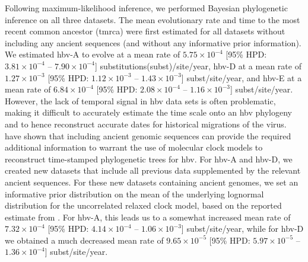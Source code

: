 Following maximum-likelihood inference, we performed Bayesian phylogenetic inference on all three datasets.
The mean evolutionary rate and time to the most recent common ancestor (\gls{tmrca}) were first estimated for all datasets without including any ancient sequences (and without any informative prior information).
We estimated \gls{hbv}-A to evolve at a mean rate of $5.75 \times 10^{-4}$ [95\% HPD: $3.81 \times 10^{-4}$ -- $7.90 \times 10^{-4}$] substitutions(subst)/site/year, \gls{hbv}-D at a mean rate of $1.27 \times 10^{-3}$ [95\% HPD: $1.12 \times 10^{-3}$ -- $1.43 \times 10^{-3}$] subst/site/year, and \gls{hbv}-E at a mean rate of $6.84 \times 10^{-4}$ [95\% HPD: $2.08 \times 10^{-4}$ -- $1.16 \times 10^{-3}$] subst/site/year.
However, the lack of temporal signal in \gls{hbv} data sets is often problematic, making it difficult to accurately estimate the time scale onto an \gls{hbv} phylogeny and to hence reconstruct accurate dates for historical migrations of the virus.
\citet{muhlemann_ancient_2018} have shown that including ancient genomic sequences can provide the required additional information to warrant the use of molecular clock models to reconstruct time-stamped phylogenetic trees for \gls{hbv}.
For \gls{hbv}-A and \gls{hbv}-D, we created new datasets that include all previous data supplemented by the relevant ancient sequences.
For these new datasets containing ancient genomes, we set an informative prior distribution on the mean of the underlying lognormal distribution for the uncorrelated relaxed clock model, based on the reported estimate from \citet{muhlemann_ancient_2018}.
For \gls{hbv}-A, this leads us to a somewhat increased mean rate of $7.32 \times 10^{-4}$ [95\% HPD: $4.14 \times 10^{-4}$ -- $1.06 \times 10^{-3}$] subst/site/year, while for \gls{hbv}-D we obtained a much decreased mean rate of $9.65 \times 10^{-5}$ [95\% HPD: $5.97 \times 10^{-5}$ -- $1.36 \times 10^{-4}$] subst/site/year.

